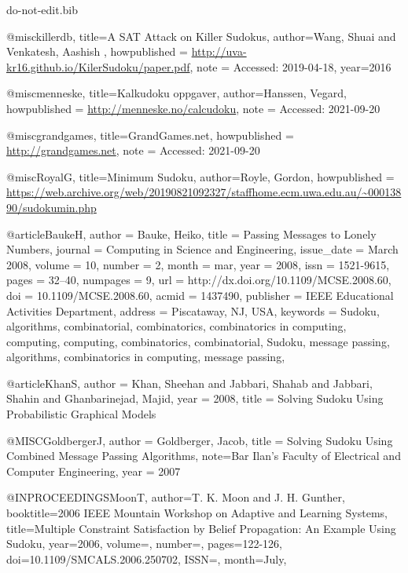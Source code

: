 \documentclass{ieeeaccess}
\begin{document}
{\begin{filecontents*}[overwrite]{do-not-edit.bib}
		
		@misc{killerdb,
			title={{A} {SAT} {A}ttack on {K}iller {S}udokus},
			author={Wang, Shuai and Venkatesh, Aashish },
			howpublished = {\url{http://uva-kr16.github.io/KilerSudoku/paper.pdf}},
			note = {Accessed: 2019-04-18},
			year={2016}
		}
		
		@misc{menneske,
			title={Kalkudoku oppgaver},
			author={Hanssen, Vegard},
			howpublished = {\url{http://menneske.no/calcudoku}},
			note = {Accessed: 2021-09-20}
		}
		
		@misc{grandgames,
			title={GrandGames.net},
			howpublished = {\url{http://grandgames.net}},
			note = {Accessed: 2021-09-20}
		}
		
		@misc{RoyalG,
			title={Minimum {S}udoku},
			author={Royle, Gordon},
			howpublished = {\url{https://web.archive.org/web/20190821092327/staffhome.ecm.uwa.edu.au/~00013890/sudokumin.php}}
		}
		
		@article{BaukeH,
			author = {Bauke, Heiko},
			title = {{P}assing {M}essages to {L}onely {N}umbers},
			journal = {Computing in Science and Engineering},
			issue_date = {March 2008},
			volume = {10},
			number = {2},
			month = mar,
			year = {2008},
			issn = {1521-9615},
			pages = {32--40},
			numpages = {9},
			url = {http://dx.doi.org/10.1109/MCSE.2008.60},
			doi = {10.1109/MCSE.2008.60},
			acmid = {1437490},
			publisher = {IEEE Educational Activities Department},
			address = {Piscataway, NJ, USA},
			keywords = {Sudoku, algorithms, combinatorial, combinatorics, combinatorics in computing, computing, computing, combinatorics, combinatorial, Sudoku, message passing, algorithms, combinatorics in computing, message passing},
		}
		
		@article{KhanS,
			author = {Khan, Sheehan and Jabbari, Shahab and Jabbari, Shahin and Ghanbarinejad, Majid},
			year = {2008},
			title = {{S}olving {S}udoku {U}sing {P}robabilistic {G}raphical {M}odels}
		}
		
		@MISC{GoldbergerJ,
			author = {Goldberger, Jacob},
			title = {{S}olving {S}udoku {U}sing {C}ombined {M}essage {P}assing {A}lgorithms},
			note={Bar Ilan's Faculty of Electrical and Computer Engineering},
			year = {2007}
		}
		
		@INPROCEEDINGS{MoonT,
			author={T. K. {Moon} and J. H. {Gunther}},
			booktitle={2006 IEEE Mountain Workshop on Adaptive and Learning Systems},
			title={{M}ultiple {C}onstraint {S}atisfaction by {B}elief {P}ropagation: {A}n {E}xample {U}sing {S}udoku},
			year={2006},
			volume={},
			number={},
			pages={122-126},
			doi={10.1109/SMCALS.2006.250702},
			ISSN={},
			month={July},}
		

\end{filecontents*}}
\end{document}
